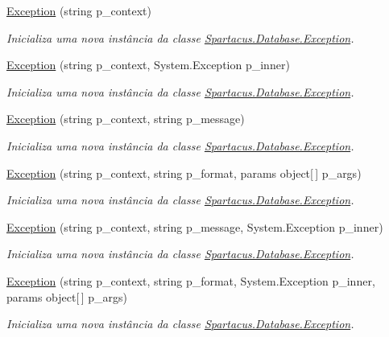 \begin{DoxyCompactItemize}
\item 
\hyperlink{classSpartacus_1_1Database_1_1Exception_adf6ace1d6f1d63ecb74e427710c18f16}{Exception} (string p\+\_\+context)
\begin{DoxyCompactList}\small\item\em Inicializa uma nova instância da classe \hyperlink{classSpartacus_1_1Database_1_1Exception}{Spartacus.\+Database.\+Exception}. \end{DoxyCompactList}\item 
\hyperlink{classSpartacus_1_1Database_1_1Exception_ad7305b35fa31867ee45e8d0dd06a9089}{Exception} (string p\+\_\+context, System.\+Exception p\+\_\+inner)
\begin{DoxyCompactList}\small\item\em Inicializa uma nova instância da classe \hyperlink{classSpartacus_1_1Database_1_1Exception}{Spartacus.\+Database.\+Exception}. \end{DoxyCompactList}\item 
\hyperlink{classSpartacus_1_1Database_1_1Exception_aecdcc30e11779a5d3fc208fbb2d4d17a}{Exception} (string p\+\_\+context, string p\+\_\+message)
\begin{DoxyCompactList}\small\item\em Inicializa uma nova instância da classe \hyperlink{classSpartacus_1_1Database_1_1Exception}{Spartacus.\+Database.\+Exception}. \end{DoxyCompactList}\item 
\hyperlink{classSpartacus_1_1Database_1_1Exception_aa6192b1b2e663fe7ebc54d7a392f930a}{Exception} (string p\+\_\+context, string p\+\_\+format, params object\mbox{[}$\,$\mbox{]} p\+\_\+args)
\begin{DoxyCompactList}\small\item\em Inicializa uma nova instância da classe \hyperlink{classSpartacus_1_1Database_1_1Exception}{Spartacus.\+Database.\+Exception}. \end{DoxyCompactList}\item 
\hyperlink{classSpartacus_1_1Database_1_1Exception_a623b43e7a582b54337fdd7ce6e9cf271}{Exception} (string p\+\_\+context, string p\+\_\+message, System.\+Exception p\+\_\+inner)
\begin{DoxyCompactList}\small\item\em Inicializa uma nova instância da classe \hyperlink{classSpartacus_1_1Database_1_1Exception}{Spartacus.\+Database.\+Exception}. \end{DoxyCompactList}\item 
\hyperlink{classSpartacus_1_1Database_1_1Exception_af68469717710e3ef88e069e5ff7d96ad}{Exception} (string p\+\_\+context, string p\+\_\+format, System.\+Exception p\+\_\+inner, params object\mbox{[}$\,$\mbox{]} p\+\_\+args)
\begin{DoxyCompactList}\small\item\em Inicializa uma nova instância da classe \hyperlink{classSpartacus_1_1Database_1_1Exception}{Spartacus.\+Database.\+Exception}. \end{DoxyCompactList}\end{DoxyCompactItemize}
